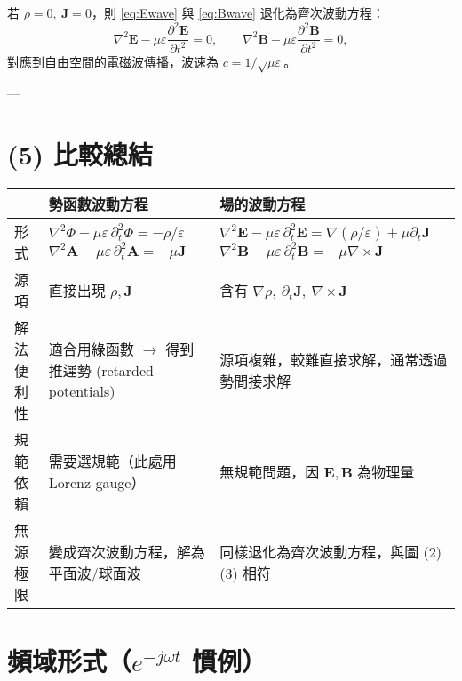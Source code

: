 \documentclass{article}
\begin{document}
若 \(\rho=0,\ \mathbf{J}=0\)，則 \eqref{eq:Ewave} 與 \eqref{eq:Bwave} 退化為齊次波動方程：
\[
\nabla^2 \mathbf{E}-\mu\varepsilon \frac{\partial^2 \mathbf{E}}{\partial t^2}=0,\qquad
\nabla^2 \mathbf{B}-\mu\varepsilon \frac{\partial^2 \mathbf{B}}{\partial t^2}=0,
\]
對應到自由空間的電磁波傳播，波速為 \(c=1/\sqrt{\mu\varepsilon}\)。

---

\section*{(5) 比較總結}

\renewcommand{\arraystretch}{1.4}
\begin{tabular}{|>{\raggedright}m{3.5cm}|>{\raggedright}m{5cm}|>{\raggedright\arraybackslash}m{5cm}|}
\hline
 & \textbf{勢函數波動方程} & \textbf{場的波動方程} \\
\hline
形式 &
\(\nabla^2\Phi-\mu\varepsilon\,\partial_t^2\Phi=-\rho/\varepsilon\) \newline
\(\nabla^2\mathbf{A}-\mu\varepsilon\,\partial_t^2\mathbf{A}=-\mu\mathbf{J}\) &
\(\nabla^2 \mathbf{E}-\mu\varepsilon\,\partial_t^2 \mathbf{E}=\nabla(\rho/\varepsilon)+\mu\partial_t\mathbf{J}\) \newline
\(\nabla^2 \mathbf{B}-\mu\varepsilon\,\partial_t^2 \mathbf{B}=-\mu\nabla\times\mathbf{J}\) \\
\hline
源項 &
直接出現 \(\rho,\mathbf{J}\) &
含有 \(\nabla\rho,\ \partial_t\mathbf{J},\ \nabla\times\mathbf{J}\) \\
\hline
解法便利性 &
適合用綠函數 \(\to\) 得到推遲勢 (retarded potentials) &
源項複雜，較難直接求解，通常透過勢間接求解 \\
\hline
規範依賴 &
需要選規範（此處用 Lorenz gauge） &
無規範問題，因 \(\mathbf{E},\mathbf{B}\) 為物理量 \\
\hline
無源極限 &
變成齊次波動方程，解為平面波/球面波 &
同樣退化為齊次波動方程，與圖 (2)(3) 相符 \\
\hline
\end{tabular}

\section*{頻域形式（$e^{-j\omega t}$ 慣例）}
\end{document}

